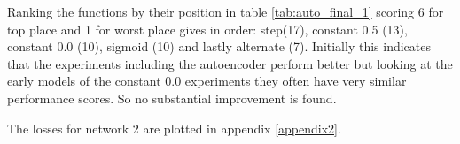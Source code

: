           Ranking the functions by their position in table \ref{tab:auto_final_1} scoring 6 for top place and 1 for worst place gives in order:
          step(17), constant 0.5 (13), constant 0.0 (10), sigmoid (10) and lastly alternate (7). Initially this indicates that the
          experiments including the autoencoder perform better but looking at the early models of the constant 0.0 experiments
          they often have very similar performance scores. So no substantial improvement is found.

          The losses for network 2 are plotted in appendix \ref{appendix2}.
